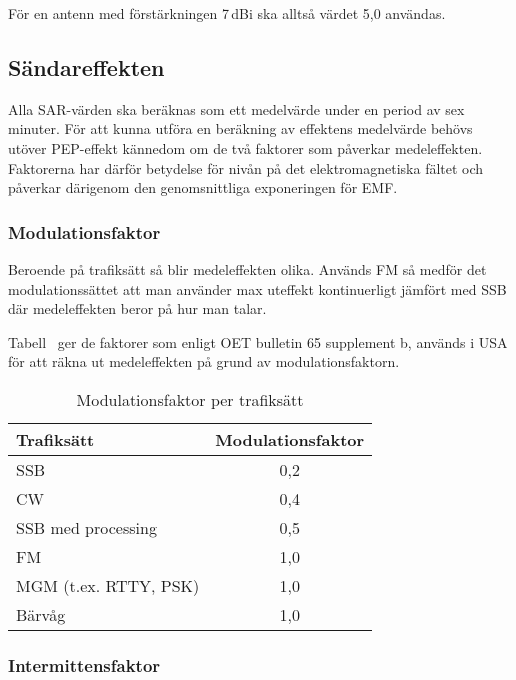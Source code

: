 För en antenn med förstärkningen 7\,dBi ska alltså värdet 5,0 användas.

\subsection{Sändareffekten}
Alla SAR-värden ska beräknas som ett medelvärde under en period av sex minuter.
För att kunna utföra en beräkning av effektens medelvärde behövs utöver
PEP-effekt kännedom om de två faktorer som påverkar medeleffekten.
Faktorerna har därför betydelse för nivån på det elektromagnetiska fältet och
påverkar därigenom den genomsnittliga exponeringen för EMF.

\subsubsection{Modulationsfaktor}

Beroende på trafiksätt så blir medeleffekten olika.
Används FM så medför det modulationssättet att man använder max uteffekt
kontinuerligt jämfört med SSB där medeleffekten beror på hur man talar.

Tabell~ ger de faktorer som enligt OET bulletin 65 supplement b,
\cite{OETbul65b} används i USA för att räkna ut medeleffekten på grund
av modulationsfaktorn.

\begin{table}[H]
  \begin{center}
    \begin{tabular}{lc}
	\textbf{Trafiksätt} & \textbf{Modulationsfaktor} \\ 
	\hline
	SSB & 0,2 \\
	CW & 0,4 \\
	SSB med processing & 0,5 \\
	FM & 1,0 \\
	MGM (t.ex. RTTY, PSK) & 1,0 \\
	Bärvåg & 1,0 \\
    \end{tabular}
    \caption{Modulationsfaktor per trafiksätt}
    \label{tab:modfakt}
  \end{center}
\end{table}

\subsubsection{Intermittensfaktor}

